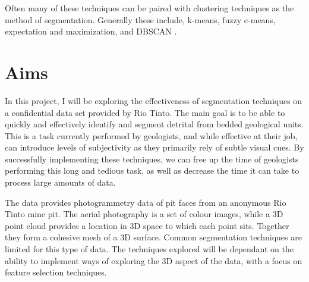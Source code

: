 \documentclass[11pt, a4paper]{article}
\begin{document}
Often many of these techniques can be paired with clustering techniques as the method of segmentation. Generally these include, k-means, fuzzy c-means, expectation and maximization, and DBSCAN \cite{dhanachandra2017survey}.


\section*{Aims}
In this project, I will be exploring the effectiveness of segmentation techniques on a confidential data set provided by Rio Tinto. The main goal is to be able to quickly and effectively  identify and segment detrital from bedded geological units. This is a task currently performed by geologists, and while effective at their job, can introduce levels of subjectivity as they primarily rely of subtle visual cues. By successfully implementing these techniques, we can free up the time of geologists performing this long and tedious task, as well as decrease the time it can take to process large amounts of data.

The data provides photogrammetry data of pit faces from an anonymous Rio Tinto mine pit. The aerial photography is a set of colour images, while a 3D point cloud provides a location in 3D space to which each point sits. Together they form a cohesive mesh of a 3D surface. Common segmentation techniques are limited for this type of data. The techniques explored will be dependant on the ability to implement ways of exploring the 3D aspect of the data, with a focus on feature selection techniques.
\end{document}
